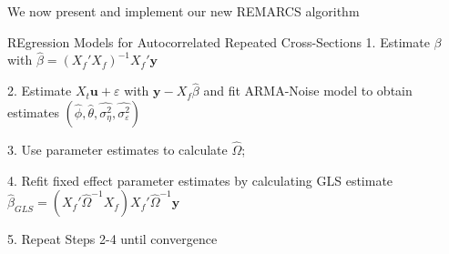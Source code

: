 \documentclass[9pt]{beamer}
\numberwithin{equation}{section}
\theoremstyle{plain}
\newcommand{\uu}{\mathbf{u}}
\begin{document}
%         



\begin{frame}[t]{We now present and implement our new REMARCS algorithm}

\begin{block}{REgression Models for Autocorrelated Repeated Cross-Sections}
    1. Estimate ${\beta}$ with $\hat{\beta} = (X_f'X_f)^{-1}X_f'\mathbf{y}$
\end{block}
\begin{block}{}
    2. Estimate $X_t\uu + \varepsilon$ with $\mathbf{y} - X_f\hat{\beta}$ and fit ARMA-Noise model to obtain estimates $(\hat{\phi}, \hat{\theta}, \hat{\sigma_\eta^2}, \hat{\sigma_\varepsilon^2})$
\end{block}
\begin{block}{}
    3. Use parameter estimates to calculate $\hat{\Omega}$;
\end{block}
\begin{block}{}
    4. Refit fixed effect parameter estimates by calculating GLS estimate $\hat{\beta}_{GLS} = (X_f'\hat{\Omega}^{-1}X_f)X_f'\hat{\Omega}^{-1}\mathbf{y}$
\end{block}
\begin{block}{}
    5. Repeat Steps 2-4 until convergence
\end{block}
\end{frame}
\end{document}
